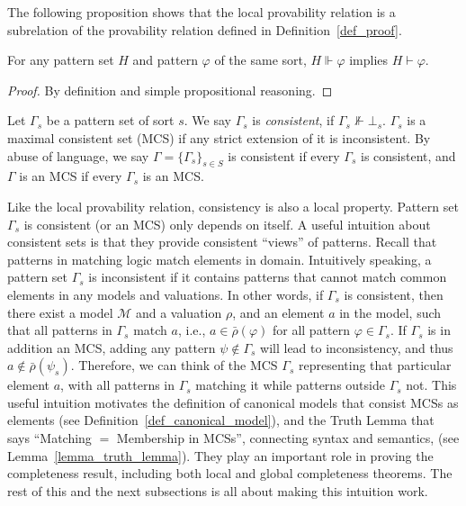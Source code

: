\documentclass[acmsmall]{acmart}
\theoremstyle{acmdefinition}
\newcommand{\MM}{\mathcal{M}}
\newcommand{\barrho}{\bar{\rho}}
\begin{document}
The following proposition shows that the local provability relation is
a subrelation of the provability relation defined in Definition~\ref{def_proof}.
\begin{proposition}
For any pattern set $H$
and pattern $\varphi$ of the same sort,
$H \Vdash \varphi$ implies $H \vdash \varphi$.
\end{proposition}
\begin{proof}
By definition and simple propositional reasoning.
\end{proof}

\begin{definition}
\label{def_consistent_sets}
Let $\Gamma_s$ be a pattern set of sort $s$.
We say $\Gamma_s$ is \emph{consistent}, if $\Gamma_s \not\Vdash \bot_s$.
$\Gamma_s$ is a maximal consistent set (MCS) 
if any strict extension of it is inconsistent.
By abuse of language,
we say $\Gamma = \{ \Gamma_s \}_{s \in S}$ 
is consistent if every $\Gamma_s$ is consistent,
and $\Gamma$ is an MCS if every $\Gamma_s$ is an MCS.
\end{definition}

Like the local provability relation,
consistency is also a local property.
Pattern set $\Gamma_s$ is consistent (or an MCS) only depends on itself.
A useful intuition about consistent sets
is that they provide consistent ``views'' of patterns.
Recall that patterns in matching logic match elements in domain.
Intuitively speaking, a pattern set $\Gamma_s$ is inconsistent
if it contains patterns 
that cannot match common elements in any models and valuations.
In other words,
if $\Gamma_s$ is consistent,
then there exist a model $\MM$ and a valuation $\rho$,
and an element $a$ in the model,
such that 
all patterns in $\Gamma_s$ match $a$,
i.e.,
$a \in \barrho(\varphi)$
for all pattern $\varphi \in \Gamma_s$.
If $\Gamma_s$ is in addition an MCS, 
adding any pattern $\psi \not\in \Gamma_s$ will lead to inconsistency, 
and thus $a \not\in \barrho(\psi_s)$.
Therefore, we can think of the MCS $\Gamma_s$ representing
that particular element $a$,
with all patterns in $\Gamma_s$ matching it
while patterns outside $\Gamma_s$ not.
This useful intuition motivates the definition of canonical models
that consist MCSs as elements (see Definition~\ref{def_canonical_model}),
and the Truth Lemma that says
``Matching $=$ Membership in MCSs'',
connecting syntax and semantics,
(see Lemma~\ref{lemma_truth_lemma}).
They play an important role in proving the completeness result,
including both local and global completeness theorems.
The rest of this and the next subsections is all about making this intuition work.
\end{document}
